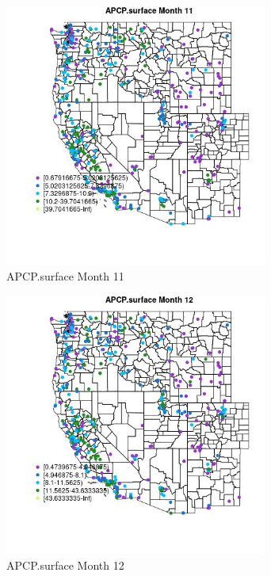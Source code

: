 \begin{figure} 
\centering  
\includegraphics[width=0.77\textwidth]{Code_Outputs/ML_input_report_ML_input_PM25_Step5_part_d_de_duplicated_aves_ML_input_MapObsMo11APCPsurface.jpg} 
\caption{\label{fig:ML_input_report_ML_input_PM25_Step5_part_d_de_duplicated_aves_ML_inputMapObsMo11APCPsurface}APCP.surface Month 11} 
\end{figure} 
 

\clearpage 

\begin{figure} 
\centering  
\includegraphics[width=0.77\textwidth]{Code_Outputs/ML_input_report_ML_input_PM25_Step5_part_d_de_duplicated_aves_ML_input_MapObsMo12APCPsurface.jpg} 
\caption{\label{fig:ML_input_report_ML_input_PM25_Step5_part_d_de_duplicated_aves_ML_inputMapObsMo12APCPsurface}APCP.surface Month 12} 
\end{figure} 
 

